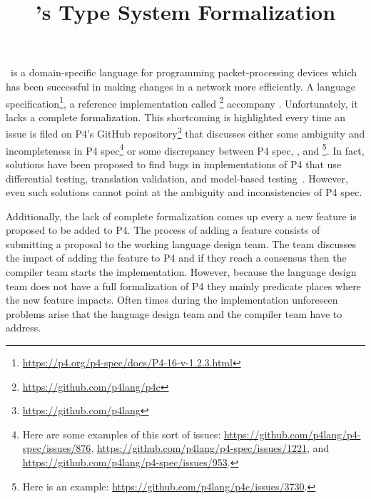\documentclass[11pt]{article}
\title{\pfour's Type System Formalization}
\begin{document}
\maketitle



\pfour\ is a domain-specific language for programming packet-processing devices 
which has been successful in making changes in a network more efficiently. 
A language specification\footnote{\url{https://p4.org/p4-spec/docs/P4-16-v-1.2.3.html}}, 
a reference implementation called \pc\footnote{\url{https://github.com/p4lang/p4c}}
accompany \pfour.
%
Unfortunately, it lacks a complete formalization. This shortcoming is highlighted 
every time an issue is filed on P4's GitHub
repository\footnote{\url{https://github.com/p4lang}} 
that discusses either some ambiguity and incompleteness in P4 spec\footnote{Here are some examples of this sort of issues: \url{https://github.com/p4lang/p4-spec/issues/876}, \url{https://github.com/p4lang/p4-spec/issues/1221}, and \url{https://github.com/p4lang/p4-spec/issues/953}.} or some discrepancy 
between P4 spec, \pc, and \petra\footnote{Here is an example: \url{https://github.com/p4lang/p4c/issues/3730}.}. 
%
In fact, solutions have been proposed to find bugs in implementations of P4 that 
use differential testing, translation validation, and model-based testing~\cite{gauntlet,p4diff}.
%
However, even such solutions cannot point at the ambiguity and 
inconsistencies of P4 spec.

Additionally, the lack of complete formalization comes up every a new feature is 
proposed to be added to P4. The process of adding a feature consists of submitting
a proposal to the working language design team. The team discusses the impact of
adding the feature to P4 and if they reach a consensus then the compiler team 
starts the implementation. 
%
However, because the language design team does not have a full formalization of P4
they mainly predicate places where the new feature impacts. Often times during the
implementation unforeseen problems arise that the language design team and the 
compiler team have to address. 
\end{document}
